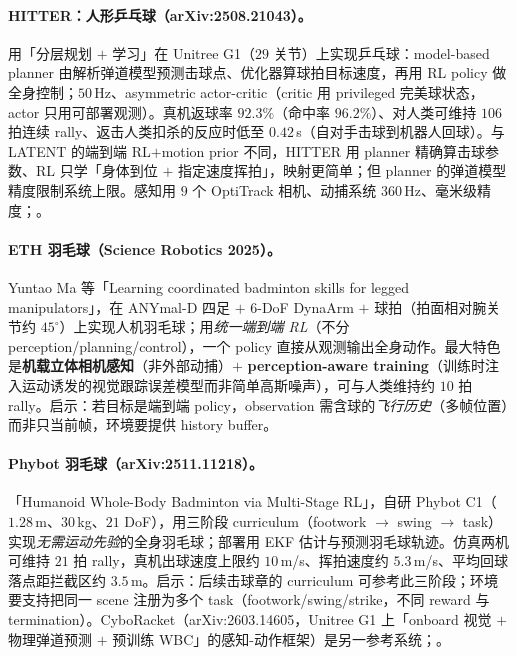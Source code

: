 \paragraph{HITTER：人形乒乓球（arXiv:2508.21043）。}用「分层规划 $+$ 学习」在 Unitree G1（$29$ 关节）上实现乒乓球\cite{tennis_hitter2025}：model-based planner 由解析弹道模型预测击球点、优化器算球拍目标速度，再用 RL policy 做全身控制；$50$\,Hz、asymmetric actor-critic（critic 用 privileged 完美球状态，actor 只用可部署观测）。真机返球率 $92.3\%$（命中率 $96.2\%$）、对人类可维持 $106$ 拍连续 rally、返击人类扣杀的反应时低至 $0.42$\,s（自对手击球到机器人回球）。与 LATENT 的端到端 RL$+$motion prior 不同，HITTER 用 planner 精确算击球参数、RL 只学「身体到位 $+$ 指定速度挥拍」，映射更简单；但 planner 的弹道模型精度限制系统上限。感知用 $9$ 个 OptiTrack 相机、动捕系统 $360$\,Hz、毫米级精度；。

\paragraph{ETH 羽毛球（Science Robotics 2025）。}Yuntao Ma 等「Learning coordinated badminton skills for legged manipulators」\cite{tennis_eth2025badminton}，在 ANYmal-D 四足 $+$ 6-DoF DynaArm $+$ 球拍（拍面相对腕关节约 $45^\circ$）上实现人机羽毛球；用\emph{统一端到端 RL}（不分 perception/planning/control），一个 policy 直接从观测输出全身动作。最大特色是\textbf{机载立体相机感知}（非外部动捕）$+$ \textbf{perception-aware training}（训练时注入运动诱发的视觉跟踪误差模型而非简单高斯噪声），可与人类维持约 $10$ 拍 rally。启示：若目标是端到端 policy，observation 需含球的\emph{飞行历史}（多帧位置）而非只当前帧，环境要提供 history buffer。

\paragraph{Phybot 羽毛球（arXiv:2511.11218）。}「Humanoid Whole-Body Badminton via Multi-Stage RL」\cite{tennis_phybot2025}，自研 Phybot C1（$1.28$\,m、$30$\,kg、$21$ DoF），用三阶段 curriculum（footwork $\to$ swing $\to$ task）实现\emph{无需运动先验}的全身羽毛球；部署用 EKF 估计与预测羽毛球轨迹。仿真两机可维持 $21$ 拍 rally，真机出球速度上限约 $10$\,m/s、挥拍速度约 $5.3$\,m/s、平均回球落点距拦截区约 $3.5$\,m。启示：后续击球章的 curriculum 可参考此三阶段；环境要支持把同一 scene 注册为多个 task（footwork/swing/strike，不同 reward 与 termination）。CyboRacket（arXiv:2603.14605，Unitree G1 上「onboard 视觉 $+$ 物理弹道预测 $+$ 预训练 WBC」的感知-动作框架\cite{tennis_cyboracket2026}）是另一参考系统；。

